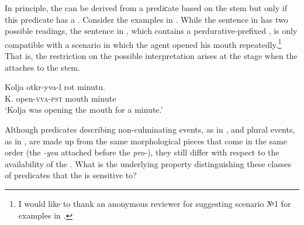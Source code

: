 \documentclass[output=paper,colorlinks,citecolor=brown,newtxmath]{langsci/langscibook}
\begin{document}
In principle, the  can be derived from a prediсate based on the   stem but only if this predicate has a . Consider the examples in . While the sentence in  has two possible readings, the sentence in , which contains a perdurative-prefixed , is only compatible with a scenario in which the agent opened his mouth repeatedly.\footnote{I would like to thank an anonymous reviewer for suggesting scenario №1 for examples in .} That is, the restriction on the possible interpretation arises at the stage when the  attaches to the stem.

\ea \label{ex:naumov:5} \ea \label{ex:naumov:5a}
\gll Kolja 		otkr-yva-l 		rot 		minutu.\\
     K. 		open-\textsc{yva}-\textsc{pst} 	mouth 		minute\\
\glt `Kolja was opening the mouth for a minute.' \\
\z

\z\z


\noindent\sloppy Although predicates describing non-culminating events, as in , and plural events, as in , are made up from the same morphological pieces that come in the same order (the  \textit{-yva} attached before the  \textit{pro-}), they still differ with respect to the availability of the . What is the underlying property distinguishing these classes of predicates that the  is sensitive to?
\end{document}

